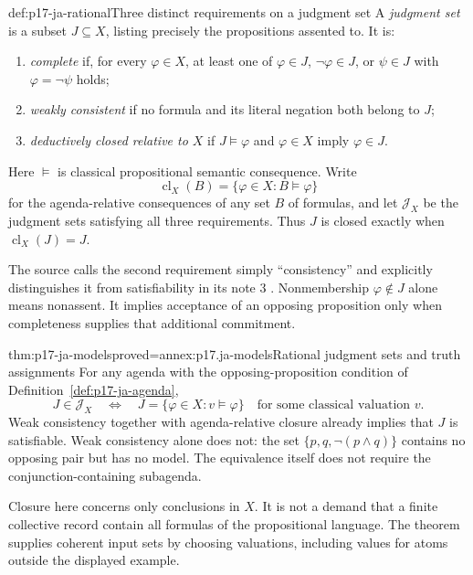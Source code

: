\begin{hbdefinition}{def:p17-ja-rational}{Three distinct requirements on a judgment set}
A \emph{judgment set} is a subset \(J\subseteq X\), listing precisely the
propositions assented to. It is:
\begin{enumerate}
\item \emph{complete} if, for every \(\varphi\in X\), at least one of
      \(\varphi\in J\), \(\neg\varphi\in J\), or
      \(\psi\in J\) with \(\varphi=\neg\psi\) holds;
\item \emph{weakly consistent} if no formula and its literal negation both
      belong to \(J\);
\item \emph{deductively closed relative to \(X\)} if
      \(J\models\varphi\) and \(\varphi\in X\) imply \(\varphi\in J\).
\end{enumerate}
Here \(\models\) is classical propositional semantic consequence. Write
\[
 \operatorname{cl}_X(B)=\{\varphi\in X:B\models\varphi\}
\]
for the agenda-relative consequences of any set \(B\) of formulas, and let
\(\mathcal J_X\) be the judgment sets satisfying all three requirements.
Thus \(J\) is closed exactly when \(\operatorname{cl}_X(J)=J\).

The source calls the second requirement simply ``consistency'' and explicitly
distinguishes it from satisfiability in its note 3
\cite[pp.~11, 27, 31]{ListPettit2001JudgmentPreprint}. Nonmembership
\(\varphi\notin J\) alone means nonassent. It implies acceptance of an opposing
proposition only when completeness supplies that additional commitment.
\end{hbdefinition}

\begin{hbtheorem}{thm:p17-ja-models}{proved=annex:p17.ja-models}{Rational judgment sets and truth assignments}
For any agenda with the opposing-proposition condition of
Definition~\ref{def:p17-ja-agenda},
\[
 J\in\mathcal J_X
 \quad\Longleftrightarrow\quad
 J=\{\varphi\in X:v\models\varphi\}
 \quad\text{for some classical valuation }v.
\]
Weak consistency together with agenda-relative closure already implies that
\(J\) is satisfiable. Weak consistency alone does not: the set
\(\{p,q,\neg(p\land q)\}\) contains no opposing pair but has no model.
The equivalence itself does not require the conjunction-containing subagenda.
\end{hbtheorem}

Closure here concerns only conclusions in \(X\). It is not a demand that a
finite collective record contain all formulas of the propositional language.
The theorem supplies coherent input sets by choosing valuations, including
values for atoms outside the displayed example.

